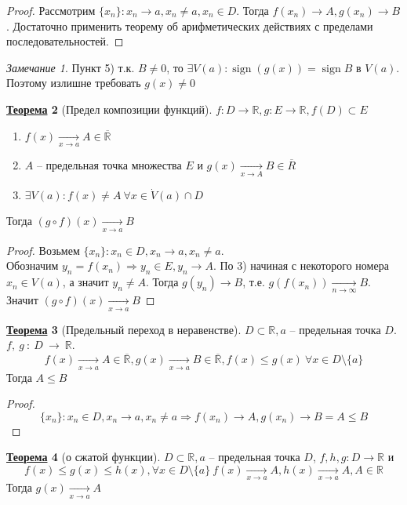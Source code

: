 \documentclass[12pt]{article}
\newenvironment{MyList}[1][4pt]{
  \begin{enumerate}[1.]
  \setlength{\parskip}{0pt}
  \setlength{\itemsep}{#1}
}{       
  \end{enumerate}
}
\def\R{\mathbb{R}}       %
\def\SO{\Rightarrow}     %
\def\Pagebreak{\pagebreak\vspace*{-1.5em}}
\theoremstyle{definition} %
\newtheorem{Thm}{\underline{Теорема}}[subsection] %
\theoremstyle{plain} %
\theoremstyle{remark} %
\newtheorem{Rem}[Thm]{Замечание} %
\DeclareMathOperator{\sign}{sign}
\begin{document}
\begin{proof}
    Рассмотрим $\{x_n\} : x_n \to a, x_n \neq a, x_n \in D$. Тогда $f(x_n) \to A, g(x_n) \to B$. Достаточно применить теорему об арифметических действиях с пределами последовательностей.  
\end{proof}

\begin{Rem}
    Пункт 5) т.к. $B \neq 0$, то $\exists V(a) : \sign (g(x)) = \sign B$ в $V(a)$. Поэтому излишне требовать $g(x) \neq 0$   
\end{Rem}

\Pagebreak
\begin{Thm}[Предел композиции функций]
    $f : D \to \R, g : E \to \R, f(D) \subset E$
    \begin{MyList}
        \item $f(x) \xrightarrow[x \to a]{} A \in \overline{\R}$
        \item $A$ -- предельная точка множества $E$ и $g(x) \xrightarrow[x \to A]{} B \in \overline{R}$
        \item $\exists V(a) : f(x) \neq A \ \forall x \in \dot{V}(a) \cap D$   
    \end{MyList} 
    Тогда $(g \circ f)(x) \xrightarrow[x \to a]{} B$ 
\end{Thm}

\begin{proof}
    Возьмем $\{x_n\} : x_n \in D, x_n \to a, x_n \neq a$. \\ Обозначим $y_n = f(x_n) \SO y_n \in E, y_n \to A$.
    По 3) начиная с некоторого номера $x_n \in V(a)$, а значит $y_n \neq A$. Тогда $g(y_n) \to B$, т.е. $g(f(x_n)) \xrightarrow[n \to \infty]{} B$.
    Значит $(g \circ f)(x) \xrightarrow[x \to a]{} B$ 
\end{proof}

\begin{Thm}[Предельный переход в неравенстве]
    $D \subset \R, a $ -- предельная точка $D$. $f,~g~:~D~\to~\R$.
    \[f(x) \xrightarrow[x \to a]{}A \in \overline{\R}, g(x) \xrightarrow[x \to a]{} B \in \overline{\R}, f(x) \leqslant g(x) \ \forall x \in D \setminus \{a\}\] 
    Тогда $A \leqslant B$ 
\end{Thm}

\begin{proof}
    \[\{x_n\} : x_n \in D, x_n \to a, x_n \neq a \SO f(x_n) \to A, g(x_n) \to B = A \leqslant B\]
\end{proof}

\begin{Thm}[о сжатой функции]
    $D \subset \R, a$ -- предельная точка $D$, $f, h, g : D \to \R$ и
    \[f(x) \leqslant g(x) \leqslant h(x), \forall x \in D \setminus \{a\} \ f(x) \xrightarrow[x \to a]{} A, h(x) \xrightarrow[x \to a]{} A, A \in \R\]
    Тогда $g(x) \xrightarrow[x \to a]{} A$  
\end{Thm}
\end{document}
